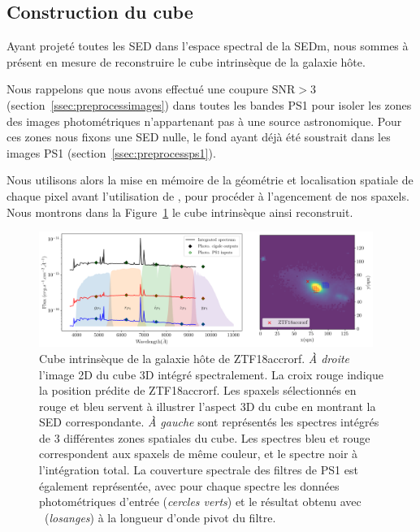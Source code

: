 \documentclass[../main/main.tex]{subfiles}
\begin{document}
\subsection{Construction du cube}

Ayant projeté toutes les SED dans l'espace spectral de la SEDm,
nous sommes à présent en mesure de reconstruire le cube intrinsèque
de la galaxie hôte.

Nous rappelons que nous avons effectué une coupure $\text{SNR}>3$ (section~\ref{ssec:preprocessimages}) dans toutes
les bandes PS1 pour isoler les zones des images photométriques
n'appartenant pas à une source astronomique. Pour ces zones nous fixons
une SED nulle, le fond ayant déjà été soustrait dans les images
PS1 (section~\ref{ssec:preprocessps1}).

Nous utilisons alors la mise en mémoire de la géométrie et localisation
spatiale de chaque pixel avant l'utilisation de \cigale, pour procéder
à l'agencement de nos spaxels.
Nous montrons dans la Figure~\ref{fig:intcube_ZTF18accrorf} le cube intrinsèque
ainsi reconstruit.

\begin{figure}[ht]
  \centering
  \includegraphics[width=0.97\textwidth]{../figures/05_sedfit/intcube_ZTF18accrorf.png}
  \caption[Cube intrinsèque de la galaxie hôte de ZTF18accrorf]{Cube
    intrinsèque de la galaxie hôte de ZTF18accrorf. \textit{À droite}
    l'image 2D du cube 3D intégré spectralement. La croix rouge indique la position prédite de
    ZTF18accrorf. Les spaxels sélectionnés en rouge et bleu servent à
    illustrer l'aspect 3D du cube en montrant la SED
    correspondante. \textit{À gauche} sont représentés les spectres intégrés de 3
    différentes zones spatiales du cube. Les spectres bleu et rouge
    correspondent aux spaxels de même couleur, et le spectre noir à
    l'intégration total. La couverture spectrale des filtres de PS1 est
    également représentée, avec pour chaque spectre les données
  photométriques d'entrée (\textit{cercles verts}) et le résultat obtenu avec
  \cigale\ (\textit{losanges}) à la longueur d'onde pivot du filtre.}\label{fig:intcube_ZTF18accrorf}
\end{figure}
\end{document}
